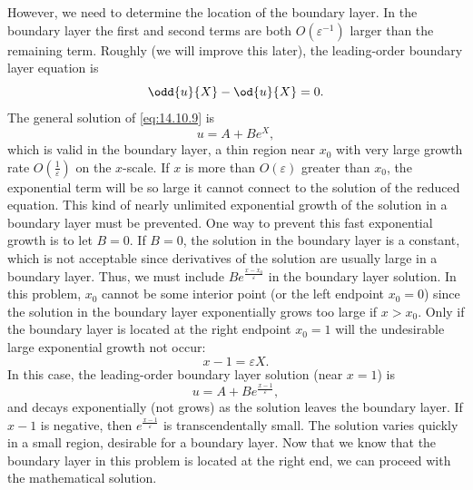 However, we need to determine the location of the boundary layer. In the boundary layer the first and second terms are both $O(\varepsilon^{-1})$ larger than the remaining term. Roughly (we will improve this later), the leading-order boundary layer equation is
\begin{equation}
\odd{u}{X} - \od{u}{X} = 0.
\label{eq:14.10.9}
\end{equation}
The general solution of \eqref{eq:14.10.9} is
\begin{equation}
\boxed{u = A + Be^X,}
\label{eq:14.10.10}
\end{equation}
which is valid in the boundary layer, a thin region near $x_0$ with very large growth rate $O(\frac{1}{\varepsilon})$ on the $x$-scale. If $x$ is more than $O(\varepsilon)$ greater than $x_0$, the exponential term will be so large it cannot connect to the solution of the reduced equation. This kind of nearly unlimited exponential growth of the solution in a boundary layer must be prevented. One way to prevent this fast exponential growth is to let $B = 0$. If $B = 0$, the solution in the boundary layer is a constant, which is not acceptable since derivatives of the solution are usually large in a boundary layer. Thus, we must include $Be^{\frac{x-x_0}{\varepsilon}}$ in the boundary layer solution. In this problem, $x_0$ cannot be some interior point (or the left endpoint $x_0 = 0$) since the solution in the boundary layer exponentially grows too large if $x > x_0$. Only if the boundary layer is located at the right endpoint $x_0 = 1$ will the undesirable large exponential growth not occur:
\begin{equation}
x - 1 = \varepsilon X.
\label{eq:14.10.11}
\end{equation}
In this case, the leading-order boundary layer solution (near $x = 1$) is
\begin{equation}
u = A + Be^{\frac{x-1}{\varepsilon}},
\label{eq:14.10.12}
\end{equation}
and decays exponentially (not grows) as the solution leaves the boundary layer. If $x - 1$ is negative, then $e^{\frac{x-1}{\varepsilon}}$ is transcendentally small. The solution varies quickly in a small region, desirable for a boundary layer. Now that we know that the boundary layer in this problem is located at the right end, we can proceed with the mathematical solution.

